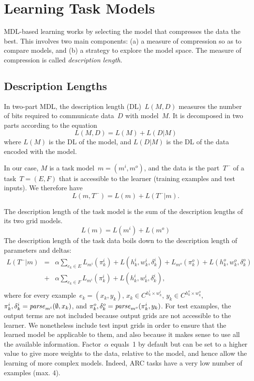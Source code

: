 \documentclass[a4paper]{llncs}
\begin{document}
\section{Learning Task Models}
\label{learning}

MDL-based learning works by selecting the model that compresses the
data the best. This involves two main components: (a) a measure of
compression so as to compare models, and (b) a strategy to explore the
model space. The measure of compression is called {\em description
  length}.

\subsection{Description Lengths}
\label{dl}

In two-part MDL, the description length (DL)~$L(M,D)$ measures the number
of bits required to communicate data~$D$ with model~$M$. It is
decomposed in two parts according to the equation
\[ L(M,D) = L(M) + L(D|M) \] where $L(M)$ is the DL of the model, and
$L(D|M)$ is the DL of the data encoded with the model.

In our case, $M$ is a task model~$m = (m^i,m^o)$, and the data is the
part~$T^-$ of a task~$T = (E,F)$ that is accessible to the learner
(training examples and test inputs). We therefore have
\[ L(m,T^-) = L(m) + L(T^-|m). \]

The description length of the task model is the sum of the description
lengths of its two grid models.
\[ L(m) = L(m^i) + L(m^o) \] 
%
The description length of the task data boils down to the description
length of parameters and deltas:
\[\begin{array}{lcl}
L(T^-|m) & = & \alpha \sum_{e_k \in E} L_{m^i}(\pi^i_k) + L(h^i_k,w^i_k,\delta^i_k) + L_{m^o}(\pi^o_k) + L(h^o_k,w^o_k,\delta^o_k) \\
& + & \alpha \sum_{e_k \in F} L_{m^i}(\pi^i_k) + L(h^i_k,w^i_k,\delta^i_k), \\
  \end{array} \]
%
where for every example~$e_k = (x_k,y_k)$,
$x_k \in C^{h^i_k \times w^i_k}$, $y_k \in C^{h^o_k \times w^o_k}$,
$\pi^i_k, \delta^i_k = {\it parse}_{m^i}(\emptyset,x_k)$, and
$\pi^o_k, \delta^o_k = {\it parse}_{m^o}(\pi^i_k,y_k)$. For test
examples, the output terms are not included because output grids are
not accessible to the learner. We nonetheless include test input grids
in order to ensure that the learned model be applicable to them, and
also because it makes sense to use all the available information.
%
Factor~$\alpha$ equals~1 by default but can be set to a higher value
to give more weights to the data, relative to the model, and hence
allow the learning of more complex models. Indeed, ARC tasks have a
very low number of examples (max. 4).
\end{document}
